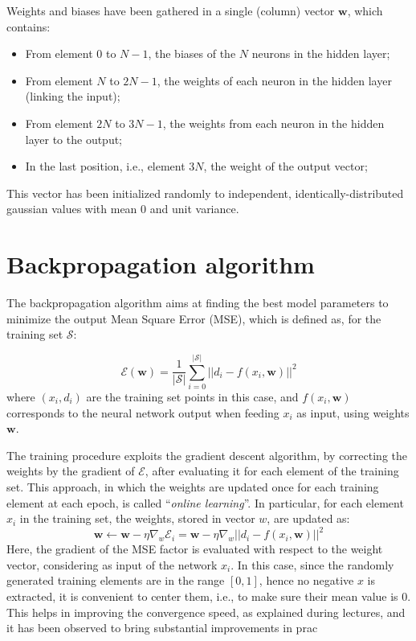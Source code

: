 \documentclass[12pt]{article}
\begin{document}
Weights and biases have been gathered in a single (column) vector $\textbf{w}$, which contains:
\begin{itemize}
  \item From element $0$ to $N-1$, the biases of the $N$ neurons in the hidden layer;
  \item From element $N$ to $2N-1$, the weights of each neuron in the hidden layer (linking the input);
  \item From element $2N$ to $3N-1$, the weights from each neuron in the hidden layer to the output;
  \item In the last position, i.e., element $3N$, the weight of the output vector;
\end{itemize}
This vector has been initialized randomly to independent, identically-distributed gaussian values with mean $0$ and unit variance.

\section{Backpropagation algorithm}\label{sec:bp}

The backpropagation algorithm aims at finding the best model parameters to minimize the output Mean Square Error (MSE), which is defined as, for the training set $\mathcal{S}$:

\begin{equation}
  \mathcal{E}(\textbf{w}) = \frac{1}{|\mathcal{S}|} \sum_{i=0}^{|\mathcal{S}|} {|| d_i - f(x_i, \textbf{w}) ||^2}
\end{equation}
where $(x_i, d_i)$ are the training set points in this case, and $f(x_i, \textbf{w})$ corresponds to the neural network output when feeding $x_i$ as input, using weights $\textbf{w}$.

The training procedure exploits the gradient descent algorithm, by correcting the weights by the gradient of $\mathcal{E}$, after evaluating it for each element of the training set.
This approach, in which the weights are updated once for each training element at each epoch, is called ``\textit{online learning}''.
In particular, for each element $x_i$ in the training set, the weights, stored in vector $w$, are updated as:
\begin{equation}\label{eq:update}
  \textbf{w} \leftarrow \textbf{w} - \eta \nabla_{w}\mathcal{E}_i = \textbf{w} - \eta \nabla_{w}||d_i - f(x_i, \textbf{w})||^2
\end{equation}
Here, the gradient of the MSE factor is evaluated with respect to the weight vector, considering as input of the network $x_i$.
In this case, since the randomly generated training elements are in the range $[0,1]$, hence no negative $x$ is extracted, it is convenient to center them, i.e., to make sure their mean value is $0$.
This helps in improving the convergence speed, as explained during lectures, and it has been observed to bring substantial improvements in prac
\end{document}
